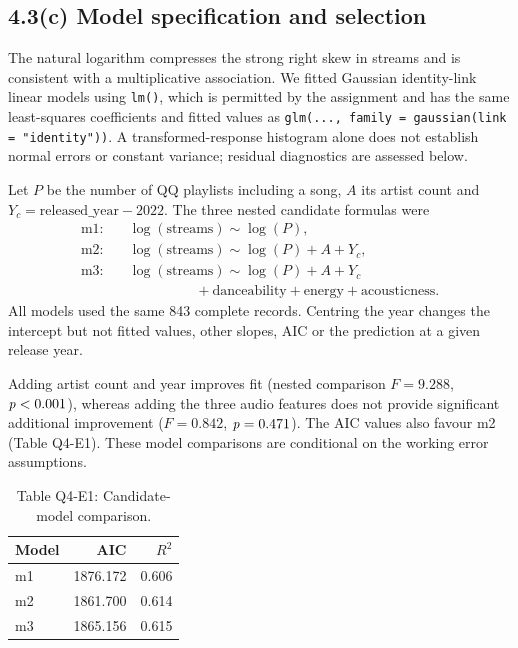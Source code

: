 \FloatBarrier
\subsection*{4.3(c) Model specification and selection}

The natural logarithm compresses the strong right skew in streams and is consistent with a multiplicative association. We fitted Gaussian identity-link linear models using \texttt{lm()}, which is permitted by the assignment and has the same least-squares coefficients and fitted values as \texttt{glm(..., family = gaussian(link = "identity"))}. A transformed-response histogram alone does not establish normal errors or constant variance; residual diagnostics are assessed below.

Let $P$ be the number of QQ playlists including a song, $A$ its artist count and $Y_c=\text{released\_year}-2022$. The three nested candidate formulas were
\[
\begin{aligned}
\text{m1:}\quad &\log(\text{streams})\sim\log(P),\\
\text{m2:}\quad &\log(\text{streams})\sim\log(P)+A+Y_c,\\
\text{m3:}\quad &\log(\text{streams})\sim\log(P)+A+Y_c\\
&\hspace{2cm}+\text{danceability}+\text{energy}+\text{acousticness}.
\end{aligned}
\]
All models used the same 843 complete records. Centring the year changes the intercept but not fitted values, other slopes, AIC or the prediction at a given release year.

Adding artist count and year improves fit (nested comparison $F=9.288$, $\mathit{p}<0.001$), whereas adding the three audio features does not provide significant additional improvement ($F=0.842$, $\mathit{p}=0.471$). The AIC values also favour m2 (Table Q4-E1). These model comparisons are conditional on the working error assumptions.

\begin{table}[htbp]\centering
\caption*{Table Q4-E1: Candidate-model comparison.}
\begin{tabular}{lrr}\toprule
Model & AIC & $R^2$ \\\midrule
m1 & 1876.172 & 0.606 \\
m2 & 1861.700 & 0.614 \\
m3 & 1865.156 & 0.615 \\\bottomrule
\end{tabular}\end{table}


